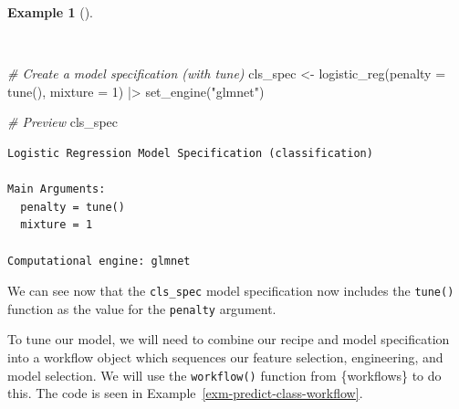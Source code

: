 \documentclass[
  letterpaper,
  krantz1]{latex/krantz-mod}
\newenvironment{Shaded}{\begin{snugshade}}{\end{snugshade}}
\newcommand{\AttributeTok}[1]{\textcolor[rgb]{0.00,0.00,0.00}{#1}}
\newcommand{\CommentTok}[1]{\textcolor[rgb]{0.00,0.00,0.00}{\textit{#1}}}
\newcommand{\DecValTok}[1]{\textcolor[rgb]{0.00,0.00,0.00}{#1}}
\newcommand{\FunctionTok}[1]{\textcolor[rgb]{0.00,0.00,0.00}{#1}}
\newcommand{\NormalTok}[1]{\textcolor[rgb]{0.00,0.00,0.00}{#1}}
\newcommand{\OtherTok}[1]{\textcolor[rgb]{0.00,0.00,0.00}{#1}}
\newcommand{\SpecialCharTok}[1]{\textcolor[rgb]{0.00,0.00,0.00}{#1}}
\newcommand{\StringTok}[1]{\textcolor[rgb]{0.00,0.00,0.00}{#1}}
\theoremstyle{definition}
\newtheorem{example}{Example}[chapter]
\theoremstyle{definition}
\theoremstyle{remark}
\begin{document}
\begin{example}[]\protect\hypertarget{exm-predict-class-model-spec-tune}{}\label{exm-predict-class-model-spec-tune}

~

\begin{Shaded}
\begin{Highlighting}[numbers=left,,]
\CommentTok{\# Create a model specification (with tune)}
\NormalTok{cls\_spec }\OtherTok{\textless{}{-}}
  \FunctionTok{logistic\_reg}\NormalTok{(}\AttributeTok{penalty =} \FunctionTok{tune}\NormalTok{(), }\AttributeTok{mixture =} \DecValTok{1}\NormalTok{) }\SpecialCharTok{|\textgreater{}}
  \FunctionTok{set\_engine}\NormalTok{(}\StringTok{"glmnet"}\NormalTok{)}

\CommentTok{\# Preview}
\NormalTok{cls\_spec}
\end{Highlighting}
\end{Shaded}

\begin{verbatim}
Logistic Regression Model Specification (classification)

Main Arguments:
  penalty = tune()
  mixture = 1

Computational engine: glmnet
\end{verbatim}

\end{example}

We can see now that the \texttt{cls\_spec} model specification now
includes the \texttt{tune()} function as the value for the
\texttt{penalty} argument.

To tune our model, we will need to combine our recipe and model
specification into a workflow object which sequences our feature
selection, engineering, and model selection. We will use the
\texttt{workflow()} function from \{workflows\} to do this. The code is
seen in Example~\ref{exm-predict-class-workflow}.
\end{document}
